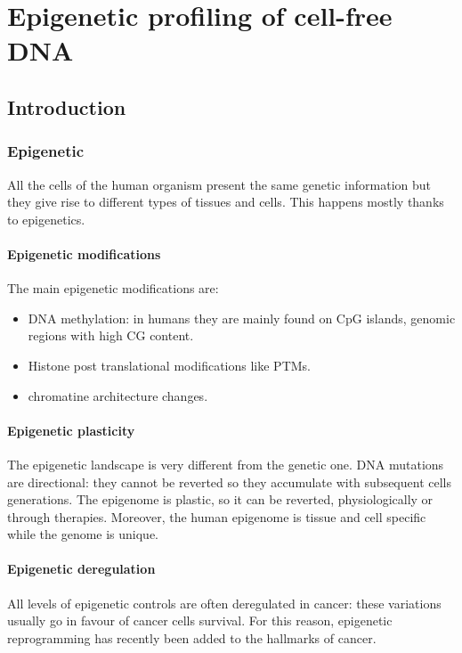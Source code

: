 \graphicspath{{chapters/notes/10/images/}}
\chapter{Epigenetic profiling of cell-free DNA}

\section{Introduction}

    \subsection{Epigenetic}
    All the cells of the human organism present the same genetic information but they give rise to different types of tissues and cells.
    This happens mostly thanks to epigenetics.

        \subsubsection{Epigenetic modifications}
        The main epigenetic modifications are:

        \begin{multicols}{2}
            \begin{itemize}
                \item DNA methylation: in humans they are mainly found on CpG islands, genomic regions with high CG content.
                \item Histone post translational modifications like PTMs.
                \item chromatine architecture changes.
            \end{itemize}
        \end{multicols}

        \subsubsection{Epigenetic plasticity}
        The epigenetic landscape is very different from the genetic one.
        DNA mutations are directional: they cannot be reverted so they accumulate with subsequent cells generations.
        The epigenome is plastic, so it can be reverted, physiologically or through therapies.
        Moreover, the human epigenome is tissue and cell specific while the genome is unique.

        \subsubsection{Epigenetic deregulation}
        All levels of epigenetic controls are often deregulated in cancer: these variations usually go in favour of cancer cells survival.
        For this reason, epigenetic reprogramming has recently been added to the hallmarks of cancer.

